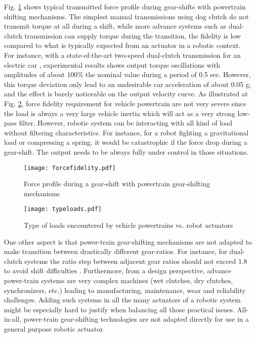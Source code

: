 Fig. \ref{fig:forcefidelity} shows typical transmitted force profile during gear-shifts with powertrain shifting mechanisms. The simplest manual transmissions using dog clutch do not transmit torque at all during a shift, while more advance systems such as dual-clutch transmission can supply torque during the transition, the fidelity is low compared to what is typically expected from an actuator in a robotic context. For instance, with a state-of-the-art two-speed dual-clutch transmission for an electric car \cite{walker_powertrain_2017}, experimental results shows output torque oscillations with amplitudes of about 100\% the nominal value during a period of 0.5 sec. However, this torque deviation only lead to an undesirable car acceleration of about 0.05 g, and the effect is barely noticeable on the output velocity curve. As illustrated at Fig. \ref{fig:typeloads}, force fidelity requirement for vehicle powertrain are not very severe since the load is always a very large vehicle inertia which will act as a very strong low-pass filter. However, robotic system can be interacting with all kind of load without filtering characteristics. For instance, for a robot fighting a gravitational load or compressing a spring, it would be catastrophic if the force drop during a gear-shift. The output needs to be always fully under control in those situations. 

\begin{figure}[htb]
	\centering
		\texttt{[image: forcefidelity.pdf]}
	\caption{Force profile during a gear-shift with powertrain gear-shifting mechanisms}
	\label{fig:forcefidelity}
\end{figure}

\begin{figure}[htb]
	\centering
		\texttt{[image: typeloads.pdf]}
	\caption{Type of loads encountered by vehicle powertrains vs. robot actuators}
	\label{fig:typeloads}
\end{figure}

One other aspect is that power-train gear-shifting mechanisms are not adapted to make transition between drastically different gear-ratios. For instance, for dual-clutch systems the ratio step between adjacent gear ratios should not exceed 1.8 to avoid shift difficulties \cite{gao_gear_2015}. Furthermore, from a design perspective, advance power-train systems are very complex machines (wet clutches, dry clutches, synchronizers, etc.) leading to manufacturing, maintenance, wear and reliability challenges. Adding such systems in all the many actuators of a robotic system might be especially hard to justify when balancing all those practical issues. All-in-all, power-train gear-shifting technologies are not adapted directly for use in a general purpose robotic actuator.

